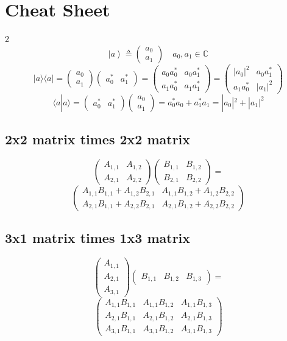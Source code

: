\documentclass[
]{article}
\providecommand{\ket}[1]{\left\lvert #1 \right\rangle}
\providecommand{\C}{\mathbb{C}}
\begin{document}
\section{Cheat Sheet}\label{cheat-sheet}
\begin{multicols}{2}
	\[
		\ket{a}\triangleq\begin{pmatrix} a_0\\ a_1\end{pmatrix}
		\quad a_0,a_1\in \C
	\]
	\[
		|a\rangle\langle a| = \begin{pmatrix} a_0 \\ a_1 \end{pmatrix}\begin{pmatrix} a_0^* & a_1^* \end{pmatrix} = \begin{pmatrix} a_0 a_0^* & a_0 a_1^* \\ a_1 a_0^* & a_1 a_1^* \end{pmatrix} = \begin{pmatrix} |a_0|^2 & a_0 a_1^* \\ a_1 a_0^* & |a_1|^2 \end{pmatrix}
	\]
	\[
		\langle a | a \rangle = \begin{pmatrix} a_0^* & a_1^* \end{pmatrix} \begin{pmatrix} a_0 \\ a_1 \end{pmatrix} = a_0^* a_0 + a_1^* a_1 = |a_0|^2 + |a_1|^2
	\]
	\subsection*	{2x2 matrix times 2x2 matrix}
	\[
		\begin{pmatrix} A_{1,1} & A_{1,2} \\ A_{2,1} & A_{2,2} \end{pmatrix} \begin{pmatrix} B_{1,1} & B_{1,2} \\ B_{2,1} & B_{2,2} \end{pmatrix}=
	\]
	\[
		\begin{pmatrix} A_{1,1}B_{1,1} + A_{1,2}B_{2,1} & A_{1,1}B_{1,2} + A_{1,2}B_{2,2} \\ A_{2,1}B_{1,1} + A_{2,2}B_{2,1} & A_{2,1}B_{1,2} + A_{2,2}B_{2,2} \end{pmatrix}
	\]
	\subsection*	{3x1 matrix times 1x3 matrix}
	\[
		\begin{pmatrix} A_{1,1} \\ A_{2,1} \\ A_{3,1} \end{pmatrix} \begin{pmatrix} B_{1,1} & B_{1,2} & B_{1,3} \end{pmatrix}=
	\]
	\[
		\begin{pmatrix} A_{1,1}B_{1,1} & A_{1,1}B_{1,2} & A_{1,1}B_{1,3} \\ A_{2,1}B_{1,1} & A_{2,1}B_{1,2} & A_{2,1}B_{1,3} \\ A_{3,1}B_{1,1} & A_{3,1}B_{1,2} & A_{3,1}B_{1,3} \end{pmatrix}
	\]

\end{multicols}
\end{document}
